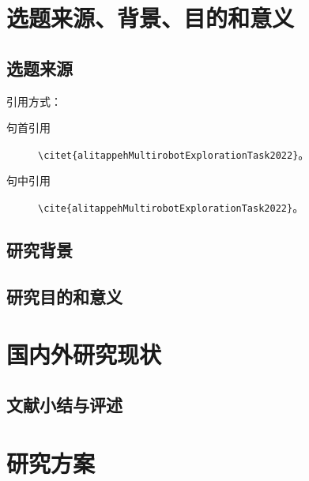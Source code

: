 \documentclass[draftformat,mathCMR]{HUSTthesis}
\begin{document}
\graphicspath{{figures/}}


\frontmatter

\makecover
\makeattention

\tableofcontents

% 

\mainmatter

\raggedbottom

%
%

\chapter{选题来源、背景、目的和意义}

\section{选题来源}
引用方式：\begin{description}
	\item[句首引用] \verb|\citet{alitappehMultirobotExplorationTask2022}|。\citet{alitappehMultirobotExplorationTask2022}
	\item[句中引用] \verb|\cite{alitappehMultirobotExplorationTask2022}|。\cite{alitappehMultirobotExplorationTask2022}
\end{description}


\section{研究背景}
\section{研究目的和意义}



\chapter{国内外研究现状}



\section{文献小结与评述}


\chapter{研究方案}
\end{document}
